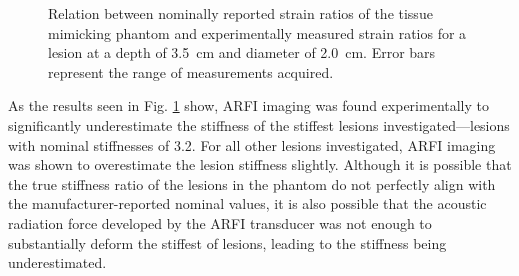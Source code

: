 			\begin{figure}[!htb]
				\centering
				\caption[Experimental ARFI model results]{Relation between nominally reported strain ratios of the tissue mimicking phantom and experimentally measured strain ratios for a lesion at a depth of \SI{3.5}{\cm} and diameter of \SI{2.0}{\cm}. Error bars represent the range of measurements acquired.}
				\label{fig:arfi_phantom_validation_nominal}
			\end{figure}

			As the results seen in Fig. \ref{fig:arfi_phantom_validation_nominal} show, ARFI imaging was found experimentally to significantly underestimate the stiffness of the stiffest lesions investigated---lesions with nominal stiffnesses of 3.2. For all other lesions investigated, ARFI imaging was shown to overestimate the lesion stiffness slightly. Although it is possible that the true stiffness ratio of the lesions in the phantom do not perfectly align with the manufacturer-reported nominal values, it is also possible that the acoustic radiation force developed by the ARFI transducer was not enough to substantially deform the stiffest of lesions, leading to the stiffness being underestimated.

